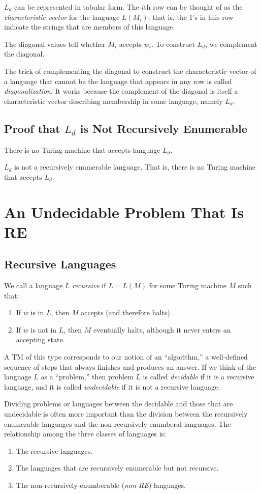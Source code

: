 \documentclass[]{article}
\begin{document}
$L_d$ can be represented in tabular form. The $i$th row can be thought of as the
\emph{characteristic vector} for the language $L(M_i)$; that is, the 1's in this
row indicate the strings that are members of this language.

The diagonal values tell whether $M_i$ accepts $w_i$. To construct $L_d$, we
complement the diagonal.

The trick of complementing the diagonal to construct the characteristic vector
of a language that cannot be the language that appears in any row is called
\emph{diagonalization}. It works because the complement of the diagonal is
itself a characteristic vector describing membership in some language, namely
$L_d$.

\subsection*{Proof that $L_d$ is Not Recursively Enumerable}
There is no Turing machine that accepts language $L_d$.
\begin{thm}
$L_d$ is not a recursively enumerable language. That is, there is no Turing
machine that accepts $L_d$.
\end{thm}

\section*{An Undecidable Problem That Is RE}
\subsection*{Recursive Languages}
We call a language $L$ \emph{recursive} if $L = L(M)$ for some Turing machine
$M$ such that:
\begin{enumerate}
\item If $w$ is in $L$, then $M$ accepts (and therefore halts).
\item If $w$ is not in $L$, then $M$ eventually halts, although it never enters
an accepting state.
\end{enumerate}
A TM of this type corresponds to our notion of an ``algorithm,'' a well-defined
sequence of steps that always finishes and produces an answer. If we think of
the language $L$ as a ``problem,'' then problem $L$ is called \emph{decidable}
if it is a recursive language, and it is called \emph{undecidable} if it is not
a recursive language.

Dividing problems or languages between the decidable and those that are
undecidable is often more important than the division between the recursively
enumerable languages and the non-recursively-enumberal languages. The
relationship among the three classes of languages is:
\begin{enumerate}
\item The recursive languages.
\item The languages that are recursively enumerable but not recursive.
\item The non-recursively-enumberable (\emph{non-RE}) languages.
\end{enumerate}
\end{document}
